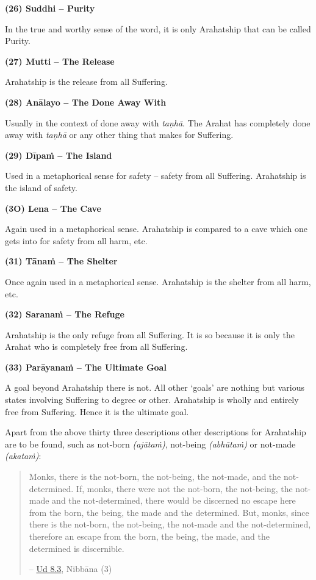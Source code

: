 \textbf{(26) Suddhi -- Purity}

\protect\hypertarget{suddhi}{}{}In the true and worthy sense of the word, it is only Arahatship that can be called Purity.

\textbf{(27) Mutti -- The Release}

Arahatship is the release from all Suffering.

\textbf{(28) Anālayo -- The Done Away With}

Usually in the context of done away with \emph{taṇhā}. The Arahat has completely done away with \emph{taṇhā} or any other thing that makes for Suffering.

\textbf{(29) Dīpaṁ -- The Island}

Used in a metaphorical sense for safety -- safety from all Suffering. Arahatship is the island of safety.

\textbf{(3O) Lena -- The Cave}

Again used in a metaphorical sense. Arahatship is compared to a cave which one gets into for safety from all harm, etc.

\textbf{(31) Tānaṁ -- The Shelter}

Once again used in a metaphorical sense. Arahatship is the shelter from all harm, etc.

\textbf{(32) Saranaṁ -- The Refuge}

Arahatship is the only refuge from all Suffering. It is so because it is only the Arahat who is completely free from all Suffering.

\textbf{(33) Parāyanaṁ -- The Ultimate Goal}

A goal beyond Arahatship there is not. All other `goals' are nothing but various states involving Suffering to  degree or other. Arahatship is wholly and entirely free from Suffering. Hence it is the ultimate goal.

\sectionBreak

Apart from the above thirty three descriptions other descriptions for Arahatship are to be found, such as not-born \emph{(ajātaṁ)}, not-being \emph{(abhūtaṁ)} or not-made \emph{(akataṁ)}:

\begin{quote}
Monks, there is the not-born, the not-being, the not-made, and the not-determined. If, monks, there were not the not-born, the not-being, the not-made and the not-determined, there would be discerned no escape here from the born, the being, the made and the determined. But, monks, since there is the not-born, the not-being, the not-made and the not-determined, therefore an escape from the born, the being, the made, and the determined is discernible.

-- \href{https://suttacentral.net/ud8.3/en/anandajoti}{Ud 8.3}, Nibbāna (3)
\end{quote}

